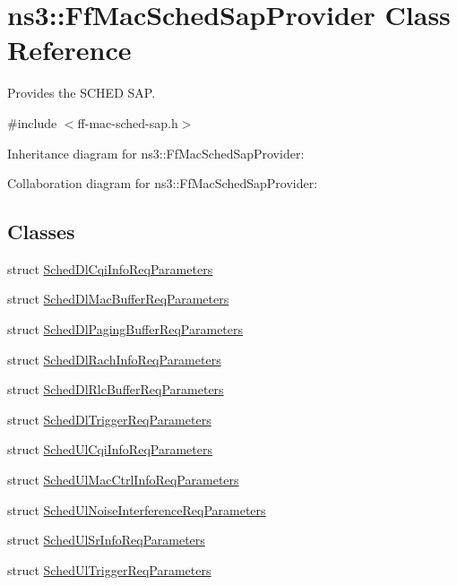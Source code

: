 \hypertarget{classns3_1_1FfMacSchedSapProvider}{}\section{ns3\+:\+:Ff\+Mac\+Sched\+Sap\+Provider Class Reference}
\label{classns3_1_1FfMacSchedSapProvider}


Provides the S\+C\+H\+ED S\+AP.  




{\ttfamily \#include $<$ff-\/mac-\/sched-\/sap.\+h$>$}



Inheritance diagram for ns3\+:\+:Ff\+Mac\+Sched\+Sap\+Provider\+:


Collaboration diagram for ns3\+:\+:Ff\+Mac\+Sched\+Sap\+Provider\+:
\subsection*{Classes}
\begin{DoxyCompactItemize}
\item 
struct \hyperlink{structns3_1_1FfMacSchedSapProvider_1_1SchedDlCqiInfoReqParameters}{Sched\+Dl\+Cqi\+Info\+Req\+Parameters}
\item 
struct \hyperlink{structns3_1_1FfMacSchedSapProvider_1_1SchedDlMacBufferReqParameters}{Sched\+Dl\+Mac\+Buffer\+Req\+Parameters}
\item 
struct \hyperlink{structns3_1_1FfMacSchedSapProvider_1_1SchedDlPagingBufferReqParameters}{Sched\+Dl\+Paging\+Buffer\+Req\+Parameters}
\item 
struct \hyperlink{structns3_1_1FfMacSchedSapProvider_1_1SchedDlRachInfoReqParameters}{Sched\+Dl\+Rach\+Info\+Req\+Parameters}
\item 
struct \hyperlink{structns3_1_1FfMacSchedSapProvider_1_1SchedDlRlcBufferReqParameters}{Sched\+Dl\+Rlc\+Buffer\+Req\+Parameters}
\item 
struct \hyperlink{structns3_1_1FfMacSchedSapProvider_1_1SchedDlTriggerReqParameters}{Sched\+Dl\+Trigger\+Req\+Parameters}
\item 
struct \hyperlink{structns3_1_1FfMacSchedSapProvider_1_1SchedUlCqiInfoReqParameters}{Sched\+Ul\+Cqi\+Info\+Req\+Parameters}
\item 
struct \hyperlink{structns3_1_1FfMacSchedSapProvider_1_1SchedUlMacCtrlInfoReqParameters}{Sched\+Ul\+Mac\+Ctrl\+Info\+Req\+Parameters}
\item 
struct \hyperlink{structns3_1_1FfMacSchedSapProvider_1_1SchedUlNoiseInterferenceReqParameters}{Sched\+Ul\+Noise\+Interference\+Req\+Parameters}
\item 
struct \hyperlink{structns3_1_1FfMacSchedSapProvider_1_1SchedUlSrInfoReqParameters}{Sched\+Ul\+Sr\+Info\+Req\+Parameters}
\item 
struct \hyperlink{structns3_1_1FfMacSchedSapProvider_1_1SchedUlTriggerReqParameters}{Sched\+Ul\+Trigger\+Req\+Parameters}
\end{DoxyCompactItemize}
